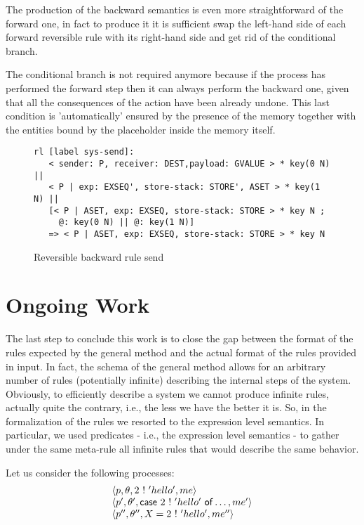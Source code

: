 \documentclass{article}[12pt,a4paper]
\theoremstyle{definition}
\begin{document}
The production of the backward semantics is even more straightforward of the
forward one, in fact to produce it it is sufficient swap the left-hand side of
each forward reversible rule with its right-hand side and get rid of the
conditional branch.

The conditional branch is not required anymore because if the process has
performed the forward step then it can always perform the backward one, given
that all the consequences of the action have been already undone. This last
condition is 'automatically' ensured by the presence of the memory together with
the entities bound by the placeholder inside the memory itself.

\begin{figure}[t]
  \centering
\begin{verbatim}
rl [label sys-send]:
   < sender: P, receiver: DEST,payload: GVALUE > * key(0 N) || 
   < P | exp: EXSEQ', store-stack: STORE', ASET > * key(1 N) || 
   [< P | ASET, exp: EXSEQ, store-stack: STORE > * key N ;
     @: key(0 N) || @: key(1 N)]
   => < P | ASET, exp: EXSEQ, store-stack: STORE > * key N 
\end{verbatim}
  
  \caption{Reversible backward rule send}
  \label{fig:revsend}
\end{figure}


\section{Ongoing Work}\label{sec:ongoing-work}

The last step to conclude this work is to close the gap between the format of
the rules expected by the general method and the actual format of the rules
provided in input. In fact, the schema of the general method allows for an
arbitrary number of rules (potentially infinite) describing the internal steps
of the system. Obviously, to efficiently describe a system we cannot produce
infinite rules, actually quite the contrary, i.e., the less we have the better
it is. So, in the formalization of the rules we resorted to the expression level
semantics. In particular, we used predicates - i.e., the expression level semantics - to gather
under the same meta-rule all infinite rules that would describe the same
behavior.

Let us consider the following processes:
\[
  \begin{array}{l}
    \langle p, \theta, 2~\mathsf{!}~'hello', me\rangle\\
    \langle p', \theta', \mathsf{case}~2~\mathsf{!}~'hello'~\mathsf{of} \ldots, me'\rangle\\
    \langle p'', \theta'', X = 2~\mathsf{!}~'hello', me''\rangle 
  \end{array}
\]
\end{document}
